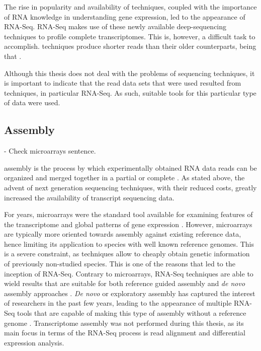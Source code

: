 The rise in popularity and availability of \ngs{} techniques, coupled with the
importance of RNA knowledge in understanding gene expression, led to the
appearance of RNA-Seq. RNA-Seq makes use of these newly available
deep-sequencing techniques to profile complete transcriptomes. This is, however,
a difficult task to accomplish. \ngs{} techniques produce shorter reads than
their older counterparts, being that 
\cite[p. 671]{Martin2011}.

Although this thesis does not deal with the problems of sequencing techniques, it
is important to indicate that the read data sets that were used resulted from
\ngs{} techniques, in particular RNA-Seq. As such, suitable tools for this
particular type of data were used.

\subsection{\Trans{} Assembly}\label{sec:transassembly}

\begin{Notes}
- Check microarrays sentence.\\
\end{Notes}

\Trans{} assembly is the process by which experimentally obtained RNA data reads
can be organized and merged together in a partial or complete \trans. As stated
above, the advent of next generation sequencing techniques, with their reduced
costs, greatly increased the availability of transcript sequencing data.

For years, microarrays were the standard tool available for examining features
of the transcriptome and global patterns of gene expression \cite{Wolf2013}.
However, microarrays are typically more oriented towards assembly against
existing reference data, hence limiting its application to species with well
known reference genomes. This is a severe constraint, as \ngs{} techniques allow
to cheaply obtain genetic information of previously non-studied species. This is
one of the reasons that led to the inception of RNA-Seq. Contrary to
microarrays, RNA-Seq techniques are able to wield results that are suitable for
both reference guided assembly and \textit{de novo} assembly approaches
\cite{Wilhelm2009}. \textit{De novo} or exploratory assembly has captured the
interest of researchers in the past few years, leading to the appearance of
multiple RNA-Seq tools that are capable of making this type of assembly without
a reference genome \cite{nuno11:assemblathon}. Transcriptome assembly was not
performed during this thesis, as its main focus in terms of the RNA-Seq process
is read alignment and differential expression analysis.

